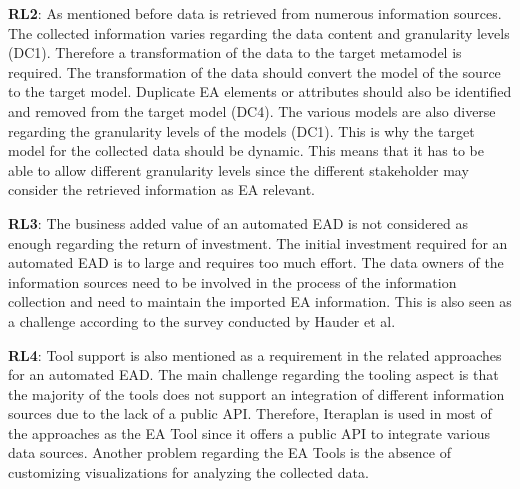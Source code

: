 \textbf{RL2}: As mentioned before data is retrieved from numerous information sources. The collected information varies regarding the data content and granularity levels (DC1). Therefore a transformation of the data to the target metamodel is required. 
The transformation of the data should convert the model of the source to the target model. Duplicate EA elements or attributes should also be identified and removed from the target model (DC4). The various models are also diverse regarding the granularity levels of the models (DC1). This is why the target model for the collected data should be dynamic. This means that it has to be able to allow different granularity levels since the different stakeholder may consider the retrieved information as EA relevant.

\textbf{RL3}: The business added value of an automated EAD is not considered as enough regarding the return of investment. The initial investment required for an automated EAD is to large and requires too much effort. The data owners of the information sources need to be involved in the process of the information collection and need to maintain the imported EA information. This is also seen as a challenge according to the survey conducted by Hauder et al. \cite{Hauder2012}\cite{Matthes2008}\cite{Matthes2014}

\textbf{RL4}: Tool support is also mentioned as a requirement in the related approaches for an automated EAD. The main challenge regarding the tooling aspect is that the majority of the tools does not support an integration of different information sources due to the lack of a public API. Therefore, Iteraplan is used in most of the approaches as the EA Tool since it offers a public API to integrate various data sources. \cite{Matthes2008}\cite{Matthes2014} Another problem regarding the EA Tools is the absence of customizing visualizations for analyzing the collected data. \cite{Hauder2012}\cite{Matthes2008}\cite{Matthes2014}

